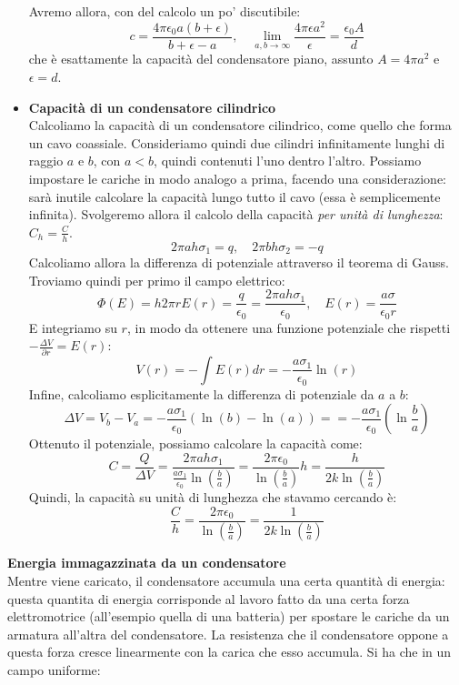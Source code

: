 \documentclass[a4paper,12pt]{article}
\begin{document}
\begin{itemize}
    Avremo allora, con del calcolo un po' discutibile:
    $$ c= \frac{4\pi\epsilon_0 a (b+\epsilon)}{b+\epsilon-a}, \quad \lim_{a,b\rightarrow\infty} \frac{4\pi\epsilon a^2}{\epsilon} = \frac{\epsilon_0 A}{d} $$
    che è esattamente la capacità del condensatore piano, assunto $A = 4\pi a^2$ e $\epsilon = d$.
  \item \textbf{Capacità di un condensatore cilindrico} \\
    Calcoliamo la capacità di un condensatore cilindrico, come quello che forma un cavo coassiale. Consideriamo quindi due cilindri infinitamente lunghi di raggio $a$ e $b$, con $a < b$, quindi contenuti l'uno dentro l'altro.
    Possiamo impostare le cariche in modo analogo a prima, facendo una considerazione: sarà inutile calcolare la capacità lungo tutto il cavo (essa è semplicemente infinita). Svolgeremo allora il calcolo della capacità \textit{per unità
    di lunghezza}: $ C_h  = \frac{C}{h}$.
    $$ 2\pi a h \sigma_1 = q, \quad 2 \pi b h \sigma_2 = -q $$
    Calcoliamo allora la differenza di potenziale attraverso il teorema di Gauss. Troviamo quindi per primo il campo elettrico:
    $$ \Phi(E) = h 2\pi r E(r) = \frac{q}{\epsilon_0} = \frac{2\pi a h\sigma_1}{\epsilon_0}, \quad E(r) = \frac{a\sigma}{\epsilon_0 r} $$
    E integriamo su $r$, in modo da ottenere una funzione potenziale che rispetti $-\frac{\Delta V}{\partial r} = E(r)$:
    $$ V(r) = -\int E(r)dr = -\frac{a\sigma_1}{\epsilon_0}\ln{(r)} $$
    Infine, calcoliamo esplicitamente la differenza di potenziale da $a$ a $b$:
    $$ \Delta V = V_b - V_a = -\frac{a\sigma_1}{\epsilon_0} (\ln{(b)} - \ln{(a)}) =  = -\frac{a\sigma_1}{\epsilon_0}\left(\ln{\frac{b}{a}}\right) $$
    Ottenuto il potenziale, possiamo calcolare la capacità come:
    $$ C = \frac{Q}{\Delta V} = \frac{2\pi a h \sigma_1}{\frac{a\sigma_1}{\epsilon_0}\ln{(\frac{b}{a})}} = \frac{2\pi \epsilon_0}{\ln{(\frac{b}{a})}}h = \frac{h}{2k\ln{(\frac{b}{a})}} $$
    Quindi, la capacità su unità di lunghezza che stavamo cercando è:
    $$ \frac{C}{h} = \frac{2\pi\epsilon_0}{\ln{(\frac{b}{a})}} = \frac{1}{2k\ln{(\frac{b}{a})}} $$
\end{itemize} 
\par\smallskip
\textbf{Energia immagazzinata da un condensatore} \\
Mentre viene caricato, il condensatore accumula una certa quantità di energia: questa quantita di energia corrisponde al lavoro fatto da una certa forza elettromotrice (all'esempio quella di una batteria) per spostare
le cariche da un armatura all'altra del condensatore. La resistenza che il condensatore oppone a questa forza cresce linearmente con la carica che esso accumula. Si ha che in un campo uniforme:
\end{document}
